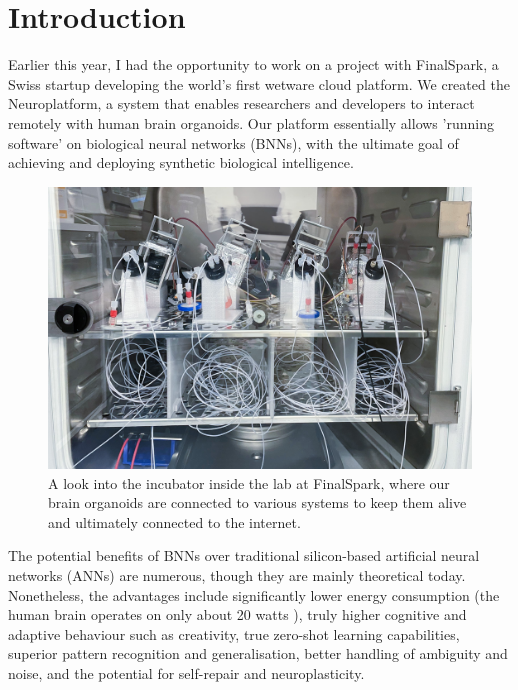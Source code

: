 \documentclass[10pt]{article}
\begin{document}
\begin{sloppypar}

  \section{Introduction}
  \label{sec:introduction}

  Earlier this year, I had the opportunity to work on a project with FinalSpark, a Swiss startup developing the world's first wetware cloud platform. We created the Neuroplatform, a system that enables researchers and developers to interact remotely with human brain organoids. Our platform essentially allows 'running software' on biological neural networks (BNNs), with the ultimate goal of achieving and deploying synthetic biological intelligence.

  \begin{figure}[ht]
    \centering
    \includegraphics[width=\textwidth]{figures/incubator.jpg}
    \caption[Brain organoid incubator at FinalSpark lab]{A look into the incubator inside the lab at FinalSpark, where our brain organoids are connected to various systems to keep them alive and ultimately connected to the internet.}
    \label{fig:incubator}
  \end{figure}

  The potential benefits of BNNs over traditional silicon-based artificial neural networks (ANNs) are numerous, though they are mainly theoretical today. Nonetheless, the advantages include significantly lower energy consumption (the human brain operates on only about 20 watts \citep{balasubramanian_brain_2021}), truly higher cognitive and adaptive behaviour such as creativity, true zero-shot learning capabilities, superior pattern recognition and generalisation, better handling of ambiguity and noise, and the potential for self-repair and neuroplasticity.


\end{sloppypar}
\end{document}
